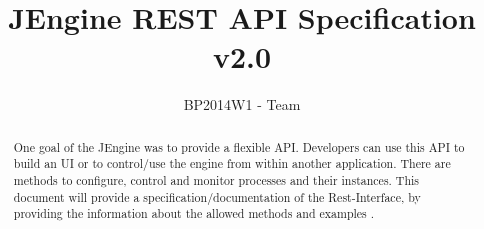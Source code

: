 \documentclass[paper=a4]{scrartcl}
\title{JEngine REST API Specification v2.0}
\author{BP2014W1 - Team}
\begin{document}
\maketitle

\setcounter{totalnumber}{5}

%
\begin{abstract}
	One goal of the JEngine was to provide a flexible API.
	Developers can use this API to build an UI or to control/use the engine from within another application.
	There are methods to configure, control and monitor processes and their instances.
	This document will provide a specification/documentation of the Rest-Interface, by providing the information about the allowed methods and examples .
\end{abstract}


%
\end{document}
